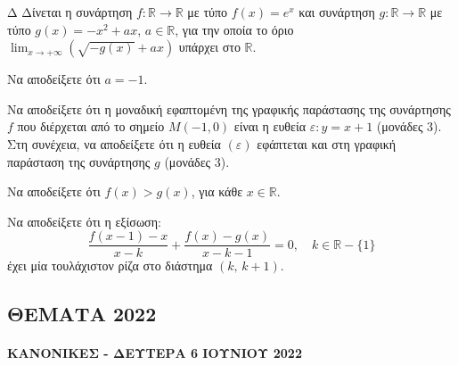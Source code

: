 \begin{thema}{Δ}
Δίνεται η συνάρτηση $f: \mathbb{R} \to \mathbb{R}$ με τύπο $f(x) = e^x$ και συνάρτηση $g: \mathbb{R} \to \mathbb{R}$ με τύπο $g(x) = -x^2 + a x$, $a \in \mathbb{R}$, για την οποία το όριο $\displaystyle\lim_{x \to +\infty}\left(\sqrt{-g(x)} + a x\right)$ υπάρχει στο $\mathbb{R}$.
\begin{erwthma}
    \item Να αποδείξετε ότι $a = -1$. 

    \item Να αποδείξετε ότι η μοναδική εφαπτομένη της γραφικής παράστασης της συνάρτησης $f$ που διέρχεται από το σημείο $M(-1, 0)$ είναι η ευθεία $\varepsilon\colon y = x + 1$ (μονάδες 3). Στη συνέχεια, να αποδείξετε ότι η ευθεία $(\varepsilon)$ εφάπτεται και στη γραφική παράσταση της συνάρτησης $g$ (μονάδες 3). 

    \item Να αποδείξετε ότι $f(x) > g(x)$, για κάθε $x \in \mathbb{R}$. 

    \item Να αποδείξετε ότι η εξίσωση:
    \[
    \frac{f(x-1) - x}{x - k} + \frac{f(x) - g(x)}{x - k - 1} = 0, \quad k \in \mathbb{R} - \{1\}
    \]
    έχει μία τουλάχιστον ρίζα στο διάστημα $(k,\, k+1)$. 
\end{erwthma}
\end{thema}

\subsection{ΘΕΜΑΤΑ 2022}
\paragraph{ΚΑΝΟΝΙΚΕΣ - ΔΕΥΤΕΡΑ 6 ΙΟΥΝΙΟΥ 2022}

